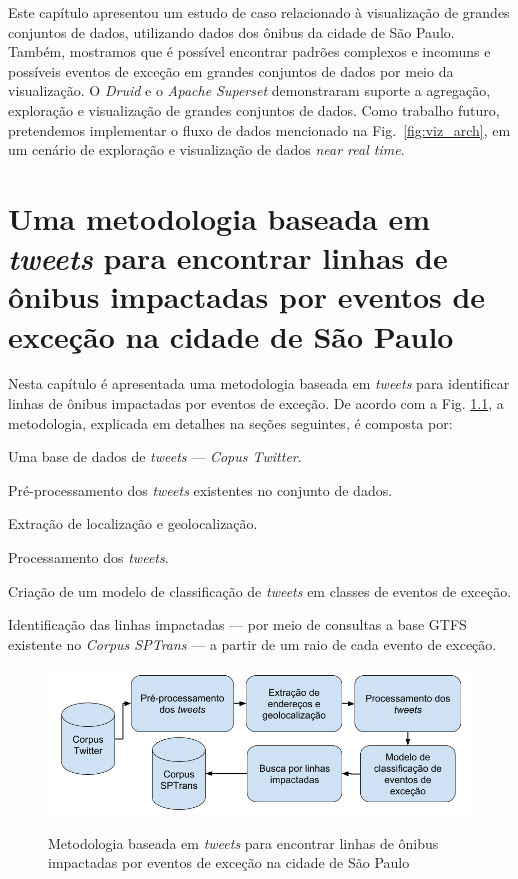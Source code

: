 \documentclass[
	12pt,				%
	oneside,			%
	a4paper,			%
	english,			%
	brazil				%
	]{abntex2ppgsi}
\begin{document}
{{Este capítulo apresentou um estudo de caso relacionado à visualização de grandes conjuntos de dados, utilizando dados dos ônibus da cidade de São Paulo. Também, mostramos que é possível encontrar padrões complexos e incomuns e possíveis eventos de exceção em grandes conjuntos de dados por meio da visualização. O \textit{Druid} e o \textit{Apache Superset} demonstraram suporte a agregação, exploração e visualização de grandes conjuntos de dados. Como trabalho futuro, pretendemos implementar o fluxo de dados mencionado na Fig.~\ref{fig:viz_arch}, em um cenário de exploração e visualização de dados \textit{near real time}.


\chapter{Uma metodologia baseada em \textit{tweets} para encontrar linhas de ônibus impactadas por eventos de exceção na cidade de São Paulo}
\label{exp1}

Nesta capítulo é apresentada uma metodologia baseada em \textit{tweets} para identificar linhas de ônibus impactadas por eventos de exceção. De acordo com a Fig. \ref{fig:tweet_based_methodology}, a metodologia, explicada em detalhes na seções seguintes, é composta por:
\begin{enumerate*}
\item Uma base de dados de \textit{tweets} --- \textit{Copus Twitter}.
\item Pré-processamento dos \textit{tweets} existentes no conjunto de dados.
\item Extração de localização e geolocalização.
\item Processamento dos \textit{tweets}.
\item Criação de um modelo de classificação de \textit{tweets} em classes de eventos de exceção.
\item Identificação das linhas impactadas --- por meio de consultas a base GTFS existente no \textit{Corpus SPTrans} --- a partir de um raio de cada evento de exceção.
\end{enumerate*}

\begin{figure}[!htb]
	\centering
 	  \caption{Metodologia baseada em \textit{tweets} para encontrar linhas de ônibus impactadas por eventos de exceção na cidade de São Paulo}
		\includegraphics[width=0.7\linewidth]{images/tweet_based_methodology_pt.png}
	\label{fig:tweet_based_methodology}
\end{figure}

}}
\end{document}
